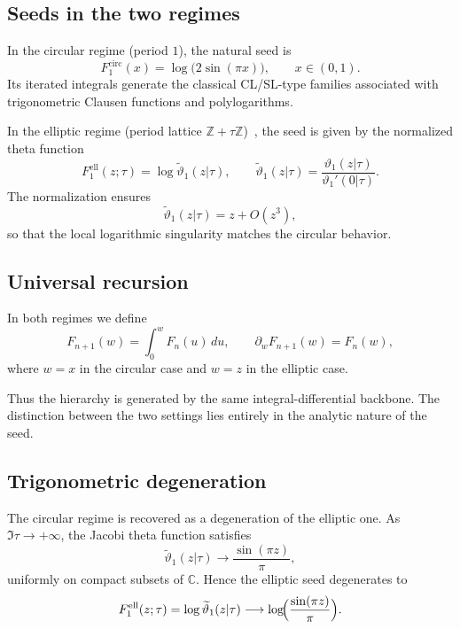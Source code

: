 \documentclass[11pt]{article}
\begin{document}
\subsection{Seeds in the two regimes}

In the circular regime (period $1$), the natural seed is
\begin{equation}\label{eq:circular-seed}
F^{\mathrm{circ}}_1(x)
=
\log\!\bigl(2\sin(\pi x)\bigr),
\qquad x\in(0,1).
\end{equation}
Its iterated integrals generate the classical CL/SL-type families
associated with trigonometric Clausen functions and polylogarithms.

In the elliptic regime (period lattice $\mathbb{Z}+\tau\mathbb{Z}$)~\cite{WhittakerWatson},
the seed is given by the normalized theta function
\begin{equation}\label{eq:elliptic-seed}
F^{\mathrm{ell}}_1(z;\tau)
=
\log \widetilde{\vartheta}_1(z|\tau),
\qquad
\widetilde{\vartheta}_1(z|\tau)
=
\frac{\vartheta_1(z|\tau)}{\vartheta_1'(0|\tau)}.
\end{equation}
The normalization ensures
\[
\widetilde{\vartheta}_1(z|\tau)=z+O(z^3),
\]
so that the local logarithmic singularity matches the circular behavior.

\subsection{Universal recursion}

In both regimes we define
\begin{equation}\label{eq:universal-recursion}
F_{n+1}(w)
=
\int_0^{w} F_n(u)\,du,
\qquad
\partial_w F_{n+1}(w)=F_n(w),
\end{equation}
where $w=x$ in the circular case and $w=z$ in the elliptic case.

Thus the hierarchy is generated by the same integral-differential backbone.
The distinction between the two settings lies entirely in the analytic
nature of the seed.


\subsection{Trigonometric degeneration}

The circular regime is recovered as a degeneration of the elliptic one.
As $\Im\tau\to+\infty$, the Jacobi theta function satisfies
\[
\widetilde{\vartheta}_1(z|\tau)
\longrightarrow
\frac{\sin(\pi z)}{\pi},
\]
uniformly on compact subsets of $\mathbb{C}$.
Hence the elliptic seed degenerates to
\[
F^{\mathrm{ell}}_1(z;\tau)
=
\log \widetilde{\vartheta}_1(z|\tau)
\longrightarrow
\log\!\Bigl(\frac{\sin(\pi z)}{\pi}\Bigr).
\]
\end{document}
